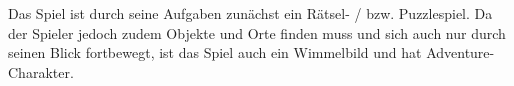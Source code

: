 
Das Spiel ist durch seine Aufgaben zunächst ein Rätsel- / bzw. Puzzlespiel. Da der Spieler jedoch zudem Objekte und Orte finden muss und sich auch nur durch seinen Blick fortbewegt, ist das Spiel auch ein Wimmelbild und hat Adventure-Charakter.